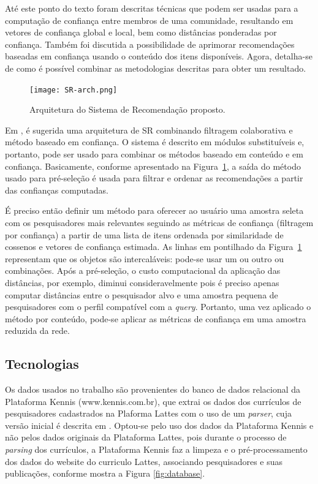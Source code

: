 \documentclass[12pt]{article}
\begin{document}
Até este ponto do texto foram descritas técnicas que podem ser usadas para a computação de confiança entre membros de uma comunidade, resultando em vetores de confiança global e local, bem como distâncias ponderadas por confiança. Também foi discutida a possibilidade de aprimorar recomendações baseadas em confiança usando o conteúdo dos itens disponíveis. Agora, detalha-se de como é possível combinar as metodologias descritas para obter um resultado.

\begin{figure}[ht]
    \centering
    \texttt{[image: SR-arch.png]}
    \caption{Arquitetura do Sistema de Recomendação proposto.}
    \label{fig:sr-arch}
\end{figure}

Em \cite{massa2004trust}, é sugerida uma arquitetura de SR combinando filtragem colaborativa e método baseado em confiança. O sistema é descrito em módulos substituíveis e, portanto, pode ser usado para combinar os métodos baseado em conteúdo e em confiança. Basicamente, conforme apresentado na Figura~\ref{fig:sr-arch}, a saída do método usado para pré-seleção é usada para filtrar e ordenar as recomendações a partir das confianças computadas.

É preciso então definir um método para oferecer ao usuário uma amostra seleta com os pesquisadores mais relevantes seguindo as métricas de confiança (filtragem por confiança) a partir de uma lista de itens ordenada por similaridade de cossenos e vetores de confiança estimada. As linhas em pontilhado da Figura~\ref{fig:sr-arch} representam que os objetos são intercaláveis: pode-se usar um ou outro ou combinações. Após a pré-seleção, o custo computacional da aplicação das distâncias, por exemplo, diminui consideravelmente pois é preciso apenas computar distâncias entre o pesquisador alvo e uma amostra pequena de pesquisadores com o perfil compatível com a \textit{query}. Portanto, uma vez aplicado o método por conteúdo, pode-se  aplicar as métricas de confiança em uma amostra reduzida da rede.

\subsection{Tecnologias}

Os dados usados no trabalho são provenientes do banco de dados relacional da Plataforma Kennis (www.kennis.com.br), que extrai os dados dos currículos de pesquisadores cadastrados na Plaforma Lattes com o uso de um \textit{parser}, cuja versão inicial é descrita em \cite{prass2019parser}. Optou-se pelo uso dos dados da Plataforma Kennis e não pelos dados originais da Plataforma Lattes, pois durante o processo de \textit{parsing} dos currículos, a Plataforma Kennis faz a limpeza e o pré-processamento dos dados do website do curriculo Lattes, associando pesquisadores e suas publicações, conforme mostra a Figura \ref{fig:database}.
\end{document}
